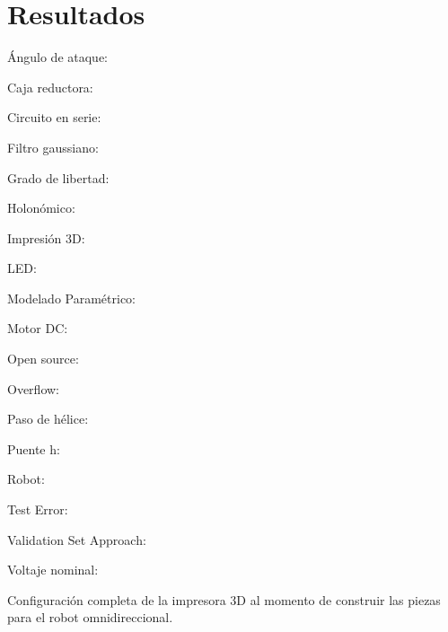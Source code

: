 \documentclass{iccmemoria}
\begin{document}
\chapter{Resultados}




\begin{glosario}
	\item[Ángulo de ataque:]
	\item[Caja reductora:]
	\item[Circuito en serie:]
	\item[Filtro gaussiano:]
	\item[Grado de libertad:]
	\item[Holonómico:]
	\item[Impresión 3D:]
	\item[LED:]
	\item[Modelado Paramétrico:]
	\item[Motor DC:]
	\item[Open source:]
	\item[Overflow:]
	\item[Paso de hélice:]
	\item[Puente h:]
	\item[Robot:]
	\item[Test Error:]
	\item[Validation Set Approach:]
	\item[Voltaje nominal:]
\end{glosario}





\appendixpart

\label{appendix:3D printer setting}
Configuración completa de la impresora 3D al momento de construir las piezas para el robot omnidireccional.
\end{document}
